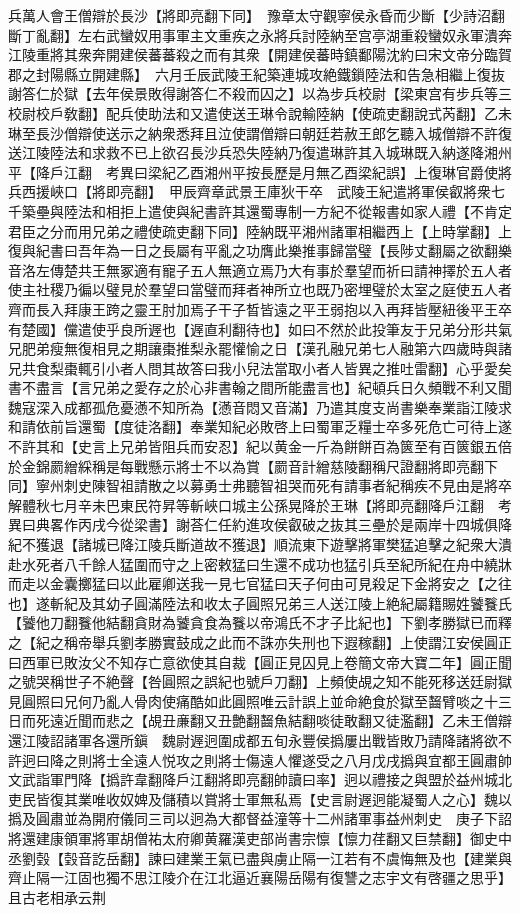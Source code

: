 兵萬人會王僧辯於長沙【將即亮翻下同】　豫章太守觀寧侯永昏而少斷【少詩沼翻斷丁亂翻】左右武蠻奴用事軍主文重疾之永將兵討陸納至宫亭湖重殺蠻奴永軍潰奔江陵重將其衆奔開建侯蕃蕃殺之而有其衆【開建侯蕃時鎮鄱陽沈約曰宋文帝分臨賀郡之封陽縣立開建縣】　六月壬辰武陵王紀築連城攻絶鐵鎻陸法和告急相繼上復抜謝答仁於獄【去年侯景敗得謝答仁不殺而囚之】以為步兵校尉【梁東宫有步兵等三校尉校戶敎翻】配兵使助法和又遣使送王琳令說輸陸納【使疏吏翻說式芮翻】乙未琳至長沙僧辯使送示之納衆悉拜且泣使謂僧辯曰朝廷若赦王郎乞聽入城僧辯不許復送江陵陸法和求救不已上欲召長沙兵恐失陸納乃復遣琳許其入城琳既入納遂降湘州平【降戶江翻　考異曰梁紀乙酉湘州平按長歷是月無乙酉梁紀誤】上復琳官爵使將兵西援峽口【將即亮翻】　甲辰齊章武景王庫狄干卒　武陵王紀遣將軍侯叡將衆七千築壘與陸法和相拒上遣使與紀書許其還蜀專制一方紀不從報書如家人禮【不肯定君臣之分而用兄弟之禮使疏吏翻下同】陸納既平湘州諸軍相繼西上【上時掌翻】上復與紀書曰吾年為一日之長屬有平亂之功膺此樂推事歸當璧【長陟丈翻屬之欲翻樂音洛左傳楚共王無冢適有寵子五人無適立焉乃大有事於羣望而祈曰請神擇於五人者使主社稷乃徧以璧見於羣望曰當璧而拜者神所立也既乃密埋璧於太室之庭使五人者齊而長入拜康王跨之靈王肘加焉子干子晳皆遠之平王弱抱以入再拜皆壓紐後平王卒有楚國】儻遣使乎良所遟也【遟直利翻待也】如曰不然於此投筆友于兄弟分形共氣兄肥弟瘦無復相見之期讓棗推梨永罷懽愉之日【漢孔融兄弟七人融第六四歲時與諸兄共食梨棗輒引小者人問其故答曰我小兒法當取小者人皆異之推吐雷翻】心乎愛矣書不盡言【言兄弟之愛存之於心非書翰之間所能盡言也】紀頓兵日久頻戰不利又聞魏寇深入成都孤危憂懣不知所為【懣音悶又音滿】乃遣其度支尚書樂奉業詣江陵求和請依前旨還蜀【度徒洛翻】奉業知紀必敗啓上曰蜀軍乏糧士卒多死危亡可待上遂不許其和【史言上兄弟皆阻兵而安忍】紀以黄金一斤為餅餅百為篋至有百篋銀五倍於金錦罽繒綵稱是每戰懸示將士不以為賞【罽音計繒慈陵翻稱尺證翻將即亮翻下同】寧州刺史陳智祖請散之以募勇士弗聽智祖哭而死有請事者紀稱疾不見由是將卒解體秋七月辛未巴東民符昇等斬峽口城主公孫晃降於王琳【將即亮翻降戶江翻　考異曰典畧作丙戌今從梁書】謝荅仁任約進攻侯叡破之抜其三壘於是兩岸十四城俱降紀不獲退【諸城已降江陵兵斷道故不獲退】順流東下遊擊將軍樊猛追擊之紀衆大潰赴水死者八千餘人猛圍而守之上密敕猛曰生還不成功也猛引兵至紀所紀在舟中繞牀而走以金囊擲猛曰以此雇卿送我一見七官猛曰天子何由可見殺足下金將安之【之往也】遂斬紀及其幼子圓滿陸法和收太子圓照兄弟三人送江陵上絶紀屬籍賜姓饕餮氏【饕他刀翻餮他結翻貪財為饕貪食為餮以帝鴻氏不才子比紀也】下劉孝勝獄已而釋之【紀之稱帝舉兵劉孝勝實鼓成之此而不誅亦失刑也下遐稼翻】上使謂江安侯圓正曰西軍已敗汝父不知存亡意欲使其自裁【圓正見囚見上卷簡文帝大寶二年】圓正聞之號哭稱世子不絶聲【咎圓照之誤紀也號戶刀翻】上頻使覘之知不能死移送廷尉獄見圓照曰兄何乃亂人骨肉使痛酷如此圓照唯云計誤上並命絶食於獄至齧臂啖之十三日而死遠近聞而悲之【覘丑亷翻又丑艶翻齧魚結翻啖徒敢翻又徒濫翻】乙未王僧辯還江陵詔諸軍各還所鎭　魏尉遟迥圍成都五旬永豐侯撝屢出戰皆敗乃請降諸將欲不許迥曰降之則將士全遠人悦攻之則將士傷遠人懼遂受之八月戊戌撝與宜都王圓肅帥文武詣軍門降【撝許韋翻降戶江翻將即亮翻帥讀曰率】迥以禮接之與盟於益州城北吏民皆復其業唯收奴婢及儲積以賞將士軍無私焉【史言尉遟迥能凝蜀人之心】魏以撝及圓肅並為開府儀同三司以迥為大都督益潼等十二州諸軍事益州刺史　庚子下詔將還建康領軍將軍胡僧祐太府卿黄羅漢吏部尚書宗懔【懔力荏翻又巨禁翻】御史中丞劉㲄【㲄音訖岳翻】諫曰建業王氣已盡與虜止隔一江若有不虞悔無及也【建業與齊止隔一江固也獨不思江陵介在江北逼近襄陽岳陽有復讐之志宇文有啓疆之思乎】且古老相承云荆